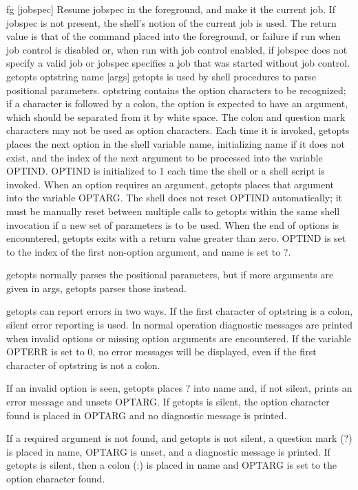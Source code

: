{fg [jobspec]
Resume jobspec in the foreground, and make it the current job. If jobspec is not present, the shell's notion of the current job is used. The return value is that of the command placed into the foreground, or failure if run when job control is disabled or, when run with job control enabled, if jobspec does not specify a valid job or jobspec specifies a job that was started without job control.
getopts optstring name [args]
getopts is used by shell procedures to parse positional parameters. optstring contains the option characters to be recognized; if a character is followed by a colon, the option is expected to have an argument, which should be separated from it by white space. The colon and question mark characters may not be used as option characters. Each time it is invoked, getopts places the next option in the shell variable name, initializing name if it does not exist, and the index of the next argument to be processed into the variable OPTIND. OPTIND is initialized to 1 each time the shell or a shell script is invoked. When an option requires an argument, getopts places that argument into the variable OPTARG. The shell does not reset OPTIND automatically; it must be manually reset between multiple calls to getopts within the same shell invocation if a new set of parameters is to be used.
When the end of options is encountered, getopts exits with a return value greater than zero. OPTIND is set to the index of the first non-option argument, and name is set to ?.

getopts normally parses the positional parameters, but if more arguments are given in args, getopts parses those instead.

getopts can report errors in two ways. If the first character of optstring is a colon, silent error reporting is used. In normal operation diagnostic messages are printed when invalid options or missing option arguments are encountered. If the variable OPTERR is set to 0, no error messages will be displayed, even if the first character of optstring is not a colon.

If an invalid option is seen, getopts places ? into name and, if not silent, prints an error message and unsets OPTARG. If getopts is silent, the option character found is placed in OPTARG and no diagnostic message is printed.

If a required argument is not found, and getopts is not silent, a question mark (?) is placed in name, OPTARG is unset, and a diagnostic message is printed. If getopts is silent, then a colon (:) is placed in name and OPTARG is set to the option character found.

}
